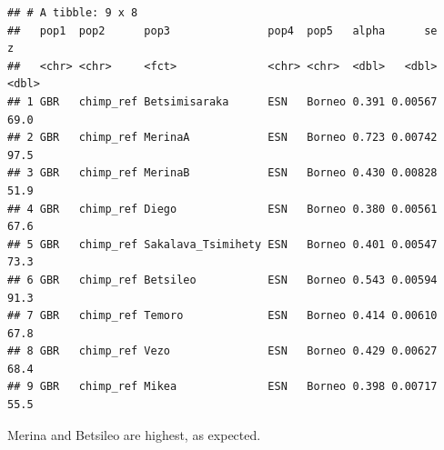 \documentclass[
]{article}
\begin{document}
\begin{verbatim}
## # A tibble: 9 x 8
##   pop1  pop2      pop3               pop4  pop5   alpha      se     z
##   <chr> <chr>     <fct>              <chr> <chr>  <dbl>   <dbl> <dbl>
## 1 GBR   chimp_ref Betsimisaraka      ESN   Borneo 0.391 0.00567  69.0
## 2 GBR   chimp_ref MerinaA            ESN   Borneo 0.723 0.00742  97.5
## 3 GBR   chimp_ref MerinaB            ESN   Borneo 0.430 0.00828  51.9
## 4 GBR   chimp_ref Diego              ESN   Borneo 0.380 0.00561  67.6
## 5 GBR   chimp_ref Sakalava_Tsimihety ESN   Borneo 0.401 0.00547  73.3
## 6 GBR   chimp_ref Betsileo           ESN   Borneo 0.543 0.00594  91.3
## 7 GBR   chimp_ref Temoro             ESN   Borneo 0.414 0.00610  67.8
## 8 GBR   chimp_ref Vezo               ESN   Borneo 0.429 0.00627  68.4
## 9 GBR   chimp_ref Mikea              ESN   Borneo 0.398 0.00717  55.5
\end{verbatim}

Merina and Betsileo are highest, as expected.
\end{document}
